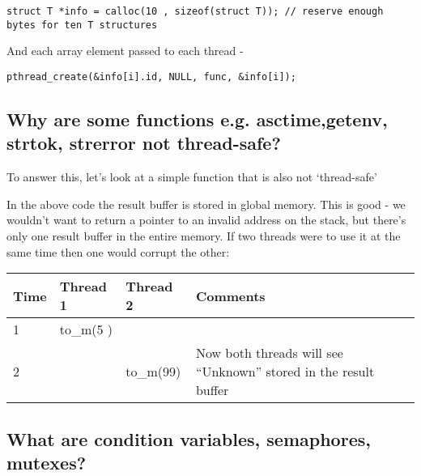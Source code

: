 \begin{verbatim}
struct T *info = calloc(10 , sizeof(struct T)); // reserve enough bytes for ten T structures
\end{verbatim}

And each array element passed to each thread -

\begin{verbatim}
pthread_create(&info[i].id, NULL, func, &info[i]);
\end{verbatim}

\subsection{Why are some functions e.g. asctime,getenv, strtok, strerror
not
thread-safe?}\label{why-are-some-functions-e.g.-asctimegetenv-strtok-strerror-not-thread-safe}

To answer this, let's look at a simple function that is also not
`thread-safe'

\begin{Shaded}
\end{Shaded}

In the above code the result buffer is stored in global memory. This is
good - we wouldn't want to return a pointer to an invalid address on the
stack, but there's only one result buffer in the entire memory. If two
threads were to use it at the same time then one would corrupt the
other:

\begin{longtable}[c]{@{}llll@{}}
\toprule
Time & Thread 1 & Thread 2 & Comments\tabularnewline
\midrule
\endhead
1 & to\_m(5 ) &\tabularnewline
2 & & to\_m(99) & Now both threads will see ``Unknown'' stored in the
result buffer\tabularnewline
\bottomrule
\end{longtable}

\subsection{What are condition variables, semaphores,
mutexes?}\label{what-are-condition-variables-semaphores-mutexes}

